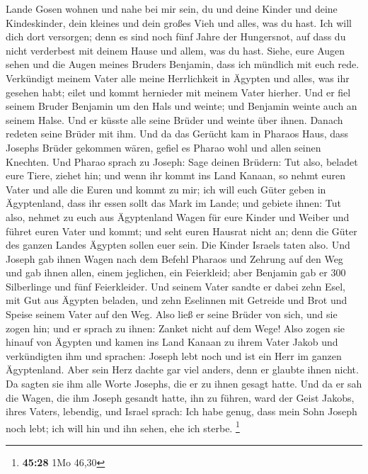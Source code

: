Lande Gosen wohnen und nahe bei mir sein, du und deine Kinder und deine
Kindeskinder, dein kleines und dein großes Vieh und alles, was du hast.
 Ich will dich dort versorgen; denn es sind noch fünf
Jahre der Hungersnot, auf dass du nicht verderbest mit deinem Hause und
allem, was du hast.  Siehe, eure Augen sehen und die
Augen meines Bruders Benjamin, dass ich mündlich mit euch rede.
 Verkündigt meinem Vater alle meine Herrlichkeit in
Ägypten und alles, was ihr gesehen habt; eilet und kommt hernieder mit
meinem Vater hierher.  Und er fiel seinem Bruder Benjamin
um den Hals und weinte; und Benjamin weinte auch an seinem Halse.
 Und er küsste alle seine Brüder und weinte über ihnen.
Danach redeten seine Brüder mit ihm.  Und da das Gerücht
kam in Pharaos Haus, dass Josephs Brüder gekommen wären, gefiel es
Pharao wohl und allen seinen Knechten.  Und Pharao sprach
zu Joseph: Sage deinen Brüdern: Tut also, beladet eure Tiere, ziehet
hin;  und wenn ihr kommt ins Land Kanaan, so nehmt euren
Vater und alle die Euren und kommt zu mir; ich will euch Güter geben in
Ägyptenland, dass ihr essen sollt das Mark im Lande;  und
gebiete ihnen: Tut also, nehmet zu euch aus Ägyptenland Wagen für eure
Kinder und Weiber und führet euren Vater und kommt;  und
seht euren Hausrat nicht an; denn die Güter des ganzen Landes Ägypten
sollen euer sein.  Die Kinder Israels taten also. Und
Joseph gab ihnen Wagen nach dem Befehl Pharaos und Zehrung auf den Weg
 und gab ihnen allen, einem jeglichen, ein Feierkleid;
aber Benjamin gab er 300 Silberlinge und fünf Feierkleider.
 Und seinem Vater sandte er dabei zehn Esel, mit Gut aus
Ägypten beladen, und zehn Eselinnen mit Getreide und Brot und Speise
seinem Vater auf den Weg.  Also ließ er seine Brüder von
sich, und sie zogen hin; und er sprach zu ihnen: Zanket nicht auf dem
Wege!  Also zogen sie hinauf von Ägypten und kamen ins
Land Kanaan zu ihrem Vater Jakob  und verkündigten ihm
und sprachen: Joseph lebt noch und ist ein Herr im ganzen Ägyptenland.
Aber sein Herz dachte gar viel anders, denn er glaubte ihnen nicht.
 Da sagten sie ihm alle Worte Josephs, die er zu ihnen
gesagt hatte. Und da er sah die Wagen, die ihm Joseph gesandt hatte, ihn
zu führen, ward der Geist Jakobs, ihres Vaters, lebendig,
 und Israel sprach: Ich habe genug, dass mein Sohn Joseph
noch lebt; ich will hin und ihn sehen, ehe ich sterbe. \footnote{\textbf{45:28}
  1Mo 46,30}

